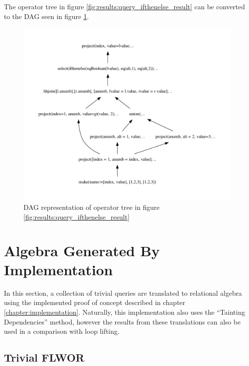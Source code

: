 The operator tree in figure \ref{fig:results:query_ifthenelse_result} can be
converted to the DAG seen in figure \ref{fig:results:query_ifthenelse_result_dag}.

\newpage

\begin{figure}[!htp]
\begin{center}
  \includegraphics[width=1.0\textwidth]{img/graphs/ifthenelse_dag}
  \caption{DAG representation of operator tree in figure
  \ref{fig:results:query_ifthenelse_result}}
  \label{fig:results:query_ifthenelse_result_dag}
\end{center}
\end{figure}

\newpage

\section{Algebra Generated By Implementation}
\label{sect:result:implementation_algebra}
In this section, a collection of trivial queries are translated to relational
algebra using the implemented proof of concept described in chapter
\ref{chapter:implementation}. Naturally, this implementation also uses the
``Tainting Dependencies'' method, however the results from these translations
can also be used in a comparison with loop lifting.

\subsection{Trivial FLWOR}
\label{sect:results:algebra:generated:trivial_flwor}
